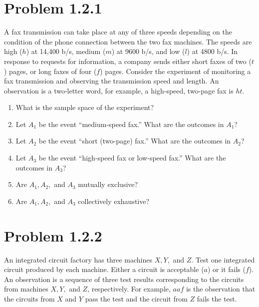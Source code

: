 \documentclass{article}
\begin{document}
\newpage

\section*{Problem 1.2.1}
A fax transmission can take place at any of three speeds depending on the condition of the phone connection between the two fax machines. The speeds are high ($h$) at 14,400 b/s, medium ($m$) at 9600 b/s, and low ($l$) at 4800 b/s. In response to requests for information, a company sends either short faxes of two ($t$) pages, or long faxes of four ($f$) pages. Consider the experiment of monitoring a fax transmission and observing the transmission speed and length. An observation is a two-letter word, for example, a high-speed, two-page fax is $ht$.

\begin{enumerate}[label=(\alph*)]
    \item What is the sample space of the experiment?
    \vspace{1.5in}
    \item Let $A_1$ be the event ``medium-speed fax.'' What are the outcomes in $A_1$?
    \vspace{1.5in}
    \item Let $A_2$ be the event ``short (two-page) fax.'' What are the outcomes in $A_2$?
    \vspace{1.5in}
    \item Let $A_3$ be the event ``high-speed fax or low-speed fax.'' What are the outcomes in $A_3$?
    \vspace{1.5in}
    \item Are $A_1, A_2,$ and $A_3$ mutually exclusive?
    \vspace{1.5in}
    \item Are $A_1, A_2,$ and $A_3$ collectively exhaustive?
    \vspace{1.5in}
\end{enumerate}

\newpage

\section*{Problem 1.2.2}
An integrated circuit factory has three machines $X, Y,$ and $Z$. Test one integrated circuit produced by each machine. Either a circuit is acceptable ($a$) or it fails ($f$). An observation is a sequence of three test results corresponding to the circuits from machines $X, Y,$ and $Z$, respectively. For example, $aaf$ is the observation that the circuits from $X$ and $Y$ pass the test and the circuit from $Z$ fails the test.
\end{document}
